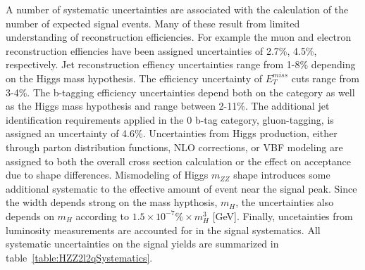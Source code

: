 A number of systematic uncertainties are associated with the calculation
of the number of expected signal events.  Many of these result from
limited understanding of reconstruction efficiencies. For example the 
muon and electron reconstruction effiencies have been assigned 
uncertainties of 2.7\%, 4.5\%, respectively.  Jet reconstruction
effiency uncertainties range from 1-8\% depending on the Higgs mass
hypothesis.  The efficiency uncertainty of $E_T^{miss}$ cuts range from
3-4\%.  The b-tagging efficiency uncertainties depend both on the 
category as well as the Higgs mass hypothesis and range between 2-11\%. 
The additional jet identification requirements applied in the 0 b-tag
category, gluon-tagging, is assigned an uncertainty of 4.6\%.
Uncertainties from Higgs production, either through parton distribution
functions, NLO corrections, or VBF modeling are assigned to both the
overall cross section calculation or the effect on acceptance due to
shape differences.  Mismodeling of Higgs $m_{ZZ}$ shape introduces some
additional systematic to the effective amount of event near the signal
peak.  Since the width depends strong on the mass hypthosis, $m_H$, the
uncertainties also depends on $m_H$ according to 
$1.5\times10^{-7}\%\times m_H^3$ [GeV].  Finally, uncetainties from 
luminosity measurements are accounted for in the signal systematics. 
All systematic uncertainties on the signal yields are summarized in 
table~\ref{table:HZZ2l2qSystematics}.

